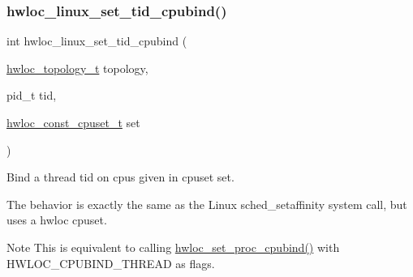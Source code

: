\subsubsection{\texorpdfstring{hwloc\+\_\+linux\+\_\+set\+\_\+tid\+\_\+cpubind()}{hwloc\_linux\_set\_tid\_cpubind()}}
{\footnotesize\ttfamily int hwloc\+\_\+linux\+\_\+set\+\_\+tid\+\_\+cpubind (\begin{DoxyParamCaption}\item[{\hyperlink{a00186_ga9d1e76ee15a7dee158b786c30b6a6e38}{hwloc\+\_\+topology\+\_\+t}}]{topology,  }\item[{pid\+\_\+t}]{tid,  }\item[{\hyperlink{a00183_ga1f784433e9b606261f62d1134f6a3b25}{hwloc\+\_\+const\+\_\+cpuset\+\_\+t}}]{set }\end{DoxyParamCaption})}



Bind a thread {\ttfamily tid} on cpus given in cpuset {\ttfamily set}. 

The behavior is exactly the same as the Linux sched\+\_\+setaffinity system call, but uses a hwloc cpuset.

\begin{DoxyNote}{Note}
This is equivalent to calling \hyperlink{a00190_ga296db8a3c6d49b51fb83d6f3e45c02a6}{hwloc\+\_\+set\+\_\+proc\+\_\+cpubind()} with H\+W\+L\+O\+C\+\_\+\+C\+P\+U\+B\+I\+N\+D\+\_\+\+T\+H\+R\+E\+AD as flags. 
\end{DoxyNote}
